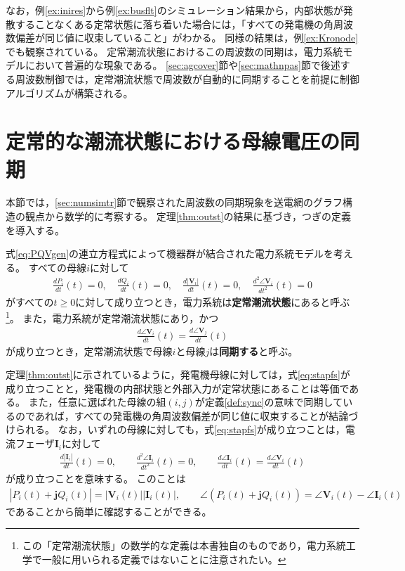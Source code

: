 \documentclass[tombow,dvipdfmx]{corona-a5-1.1}
\begin{document}
なお，例\ref{ex:inires}から例\ref{ex:busflt}のシミュレーション結果から，内部状態が発散することなくある定常状態に落ち着いた場合には，「すべての発電機の角周波数偏差が同じ値に収束していること」がわかる。
同様の結果は，例\ref{ex:Kronode}でも観察されている。
定常潮流状態におけるこの周波数の同期は，電力系統モデルにおいて普遍的な現象である。
\ref{sec:agcover}節や\ref{sec:mathnpas}節で後述する周波数制御では，定常潮流状態で周波数が自動的に同期することを前提に制御アルゴリズムが構築される。

\section{定常的な潮流状態における母線電圧の同期\advanced}\label{sec:phsync}

本節では，\ref{sec:numsimtr}節で観察された周波数の同期現象を送電網のグラフ構造の観点から数学的に考察する。
定理\ref{thm:outst}の結果に基づき，つぎの定義を導入する。

\begin{定義}[定常潮流状態と母線電圧の同期]
\label{def:sync}
式\ref{eq:PQVgen}の連立方程式によって機器群が結合された電力系統モデルを考える。
すべての母線$i$に対して
\begin{align}\label{eq:stapfs}
\frac{dP_i}{dt}(t)=0
,\quad
\frac{dQ_i}{dt}(t)=0
,\quad
\frac{d|\bm{V}_i|}{dt}(t)=0
,\quad
\frac{d^2 \angle \bm{V}_i }{dt^2}(t)=0
\end{align}
がすべての$t\geq0$に対して成り立つとき，電力系統は\textbf{定常潮流状態}にあると呼ぶ
\footnote{
この「定常潮流状態」の数学的な定義は本書独自のものであり，電力系統工学で一般に用いられる定義ではないことに注意されたい。
}。
また，電力系統が定常潮流状態にあり，かつ
\begin{align}\label{eq:defsyn}
\frac{d \angle \bm{V}_i}{dt}(t) =  \frac{d \angle \bm{V}_j}{dt}(t)
\end{align}
が成り立つとき，定常潮流状態で母線$i$と母線$j$は\textbf{同期する}と呼ぶ。
\end{定義}

定理\ref{thm:outst}に示されているように，発電機母線に対しては，式\ref{eq:stapfs}が成り立つことと，発電機の内部状態と外部入力が定常状態にあることは等価である。
また，任意に選ばれた母線の組$(i,j)$が定義\ref{def:sync}の意味で同期しているのであれば，すべての発電機の角周波数偏差が同じ値に収束することが結論づけられる。
なお，いずれの母線に対しても，式\ref{eq:stapfs}が成り立つことは，電流フェーザ$\bm{I}_i$に対して
\begin{align*}
\frac{d|\bm{I}_i|}{dt}(t)=0
,\qquad
\frac{d^2 \angle \bm{I}_i }{dt^2}(t)=0
,\qquad
\frac{d \angle \bm{I}_i }{dt}(t) = \frac{d \angle \bm{V}_i }{dt} (t)
\end{align*}
が成り立つことを意味する。
このことは
\begin{align*}
|P_i(t) + \bm{j} Q_i(t)| = |\bm{V}_i(t)| |\bm{I}_i(t)|
,\qquad
\angle(P_i(t) + \bm{j} Q_i(t)) = \angle \bm{V}_i(t) - \angle \bm{I}_i(t)
\end{align*}
であることから簡単に確認することができる。
\end{document}
